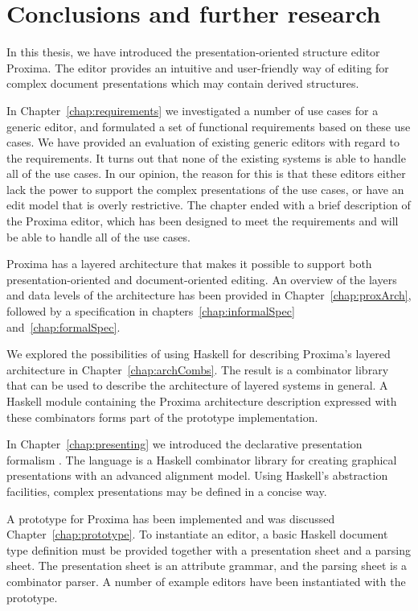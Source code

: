 \chapter{Conclusions and further research} \label{chap:conclusions}

In this thesis, we have introduced the presentation-oriented structure editor Proxima. The editor provides an intuitive and user-friendly way of editing for complex document presentations which may contain derived structures.

In Chapter~\ref{chap:requirements} we investigated a number of use cases for a generic editor, and formulated a set of functional requirements based on these use cases. We have provided an evaluation of existing generic editors with regard to the requirements. It turns out that none of the existing systems is able to handle all of the use cases. In our opinion, the reason for this is that these editors either lack the power to support the complex presentations of the use cases, or have an edit model that is overly restrictive. The chapter ended with a brief description of the Proxima editor, which has been designed to meet the requirements and will be able to handle all of the use cases.

Proxima has a layered architecture that makes it possible to support both pre\-sen\-tation-oriented and document-oriented editing. An overview of the layers and data levels of the architecture has been provided in Chapter~\ref{chap:proxArch}, followed by a specification in chapters~\ref{chap:informalSpec} and~\ref{chap:formalSpec}. 

\bc We explored the possibilities of using Haskell for describing Proxima's layered architecture in Chapter~\ref{chap:archCombs}. The result is a combinator library that can be used to describe the architecture of layered systems in general. A Haskell module containing the Proxima architecture description expressed with these combinators forms part of the prototype implementation. \ec

In Chapter~\ref{chap:presenting} we introduced the declarative presentation formalism {\Xprez}. The language is a Haskell combinator library for creating graphical presentations with an advanced alignment model. Using Haskell's abstraction facilities, complex presentations may be defined in a concise way.

A prototype for Proxima  has been implemented and was discussed Chapter~\ref{chap:prototype}. To instantiate an editor, a basic Haskell document type definition must be provided together with a presentation sheet and a parsing sheet. The presentation sheet is an attribute grammar, and the parsing sheet is a combinator parser. A number of example editors have been instantiated with the prototype.


